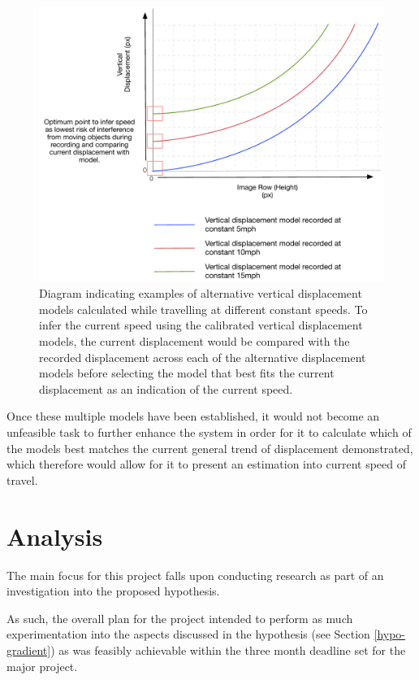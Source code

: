 \begin{figure}[ht!]
\centering
\includegraphics[scale=0.6]{images/speed_graph.pdf}
  \caption{Diagram indicating examples of alternative vertical displacement models calculated while travelling at different constant speeds. To infer the current speed using the calibrated vertical displacement models, the current displacement would be compared with the recorded displacement across each of the alternative displacement models before selecting the model that best fits the current displacement as an indication of the current speed.}
\label{fig:speed}
\end{figure}

Once these multiple models have been established, it would not become an unfeasible task to further enhance the system in order for it to calculate which of the models best matches the current general trend of displacement demonstrated, which therefore would allow for it to present an estimation into current speed of travel.

\section{Analysis}

The main focus for this project falls upon conducting research as part of an investigation into the proposed hypothesis. 

As such, the overall plan for the project intended to perform as much experimentation into the aspects discussed in the hypothesis (see Section \ref{hypo-gradient}) as was feasibly achievable within the three month deadline set for the major project.

